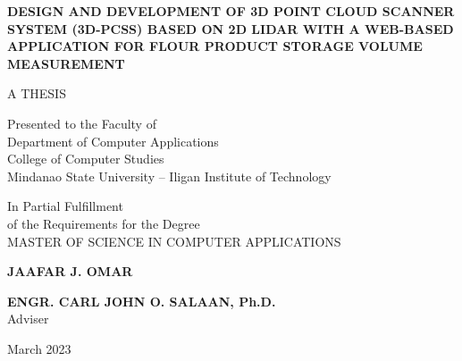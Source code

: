 \documentclass[a4paper, 12pt]{report}
\begin{document}
\begin{titlepage}
	\setlength{\topmargin}{-40pt}
	\setlength{\textheight}{664pt}
	\begin{singlespace}
		\begin{center}
			\textbf{\MakeUppercase{Design and Development of 3D Point Cloud Scanner System (3D-PCSS) based on 2D LiDAR with A Web-based Application for Flour Product Storage Volume Measurement}}
			\vspace{2.50cm}

			\MakeUppercase{A THESIS}

			\vspace{2.0cm}

			Presented to the Faculty of\\
			Department of Computer Applications\\
			College of Computer Studies \\
			Mindanao State University -- Iligan Institute of Technology

			\vspace{2.0cm}


			In Partial Fulfillment\\
			of the Requirements for the Degree\\
			MASTER OF SCIENCE IN COMPUTER APPLICATIONS

			\vspace{2.25cm}

			\textbf{JAAFAR J. OMAR}

			\vspace{3.0cm}

			\textbf{ENGR. CARL JOHN O. SALAAN, Ph.D.} \\
			Adviser
			\vspace{2.0cm}

			March 2023

		\end{center}
	\end{singlespace}
\end{titlepage}

\tableofcontents
\listoffigures
\listoftables








\end{document}
